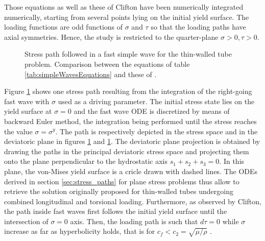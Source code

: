 Those equations as well as these of Clifton \cite{Clifton} have been numerically integrated numerically, starting from several points lying on the initial yield surface.
The loading functions are odd functions of $\sigma$ and $\tau$ \cite{Clifton} so that the loading paths have axial symmetries.
Hence, the study is restricted to the quarter-plane $\sigma>0,\tau>0$.

\begin{figure}[h!]
  \centering
   \qquad
  \caption{Stress path followed in a fast simple wave for the thin-walled tube problem. Comparison between the equations of table \ref{tab:simpleWavesEquations} and these of \cite{Clifton}.}
  \label{fig:fast_clifton}
\end{figure}
Figure \ref{fig:fast_clifton} shows one stress path resulting from the integration of the right-going fast wave with $\sigma$ used as a driving parameter.
The initial stress state lies on the yield surface at $\sigma=0$ and the fast wave ODE is discretized by means of backward Euler method, the integration being performed until the stress reaches the value $\sigma=\sigma^y$.
The path is respectively depicted in the stress space and in the deviatoric plane in figures \ref{fig:fast_clifton} and \ref{fig:fast_clifton}.
The deviatoric plane projection is obtained by drawing the paths in the principal deviatoric stress space and projecting them onto the plane perpendicular to the hydrostatic axis $s_1+s_2+s_3=0$.
In this plane, the von-Mises yield surface is a cricle drawn with dashed lines.
The ODEs derived in section \ref{sec:stress_paths} for plane stress problems thus allow to retrieve the solution originally proposed for thin-walled tubes undergoing combined longitudinal and torsional loading.
Furthermore, as observed by Clifton, the path inside fast waves first follows the initial yield surface until the intersection of $\sigma=0$ axis.
Then, the loading path is such that $d\tau=0$ while $\sigma$ increase as far as hyperbolicity holds, that is for $c_f < c_2 = \sqrt{\mu/\rho} $ \cite{Clifton}.

